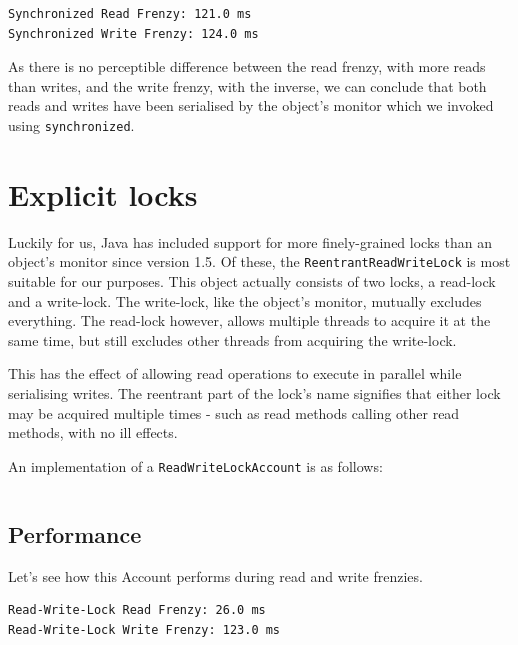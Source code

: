 \documentclass[a4paper,12pt]{kth-mag}
\begin{document}
\begin{listing}[H]
	\begin{verbatim}
Synchronized Read Frenzy: 121.0 ms
Synchronized Write Frenzy: 124.0 ms
	\end{verbatim}
\end{listing}

As there is no perceptible difference between the read frenzy, with more reads than writes, and the write frenzy, with the inverse, we can conclude that both reads and writes have been serialised by the object's monitor which we invoked using \texttt{synchronized}.

\section{Explicit locks}

Luckily for us, Java has included support for more finely-grained locks than an object's monitor since version 1.5. Of these, the \texttt{ReentrantReadWriteLock} is most suitable for our purposes. This object actually consists of two locks, a read-lock and a write-lock. The write-lock, like the object's monitor, mutually excludes everything. The read-lock however, allows multiple threads to acquire it at the same time, but still excludes other threads from acquiring the write-lock.

This has the effect of allowing read operations to execute in parallel while serialising writes. The reentrant part of the lock's name signifies that either lock may be acquired multiple times - such as read methods calling other read methods, with no ill effects.

An implementation of a \texttt{ReadWriteLockAccount} is as follows:

 \begin{listing}[H]
    \inputminted[firstline=4,linenos=true,bgcolor=code]{java}{../java_accounts/ReadWriteLockAccount.java}
\end{listing}

\subsection{Performance}

Let's see how this Account performs during read and write frenzies.

\begin{listing}[H]
	\begin{verbatim}
Read-Write-Lock Read Frenzy: 26.0 ms
Read-Write-Lock Write Frenzy: 123.0 ms
	\end{verbatim}
\end{listing}
\end{document}
